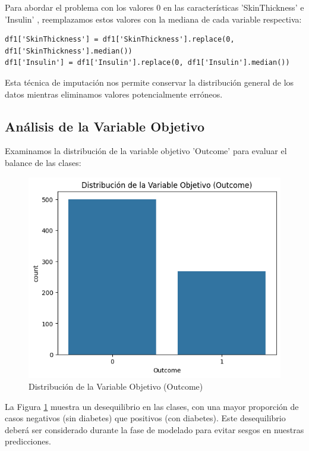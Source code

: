 \documentclass[conference]{IEEEtran}
\begin{document}
Para abordar el problema con los valores 0 en las características 'SkinThickness' e 'Insulin' , reemplazamos estos valores con la mediana de cada variable respectiva:

\begin{lstlisting}
df1['SkinThickness'] = df1['SkinThickness'].replace(0, df1['SkinThickness'].median())
df1['Insulin'] = df1['Insulin'].replace(0, df1['Insulin'].median())
\end{lstlisting}

Esta técnica de imputación nos permite conservar la distribución general de los datos mientras eliminamos valores potencialmente erróneos.

\subsection{Análisis de la Variable Objetivo}

Examinamos la distribución de la variable objetivo 'Outcome' para evaluar el balance de las clases:

\begin{figure}[h]
\centering
\includegraphics[width=\linewidth]{distribucion_outcome.png}
\caption{Distribución de la Variable Objetivo (Outcome)}
\label{fig:outcome_dist}
\end{figure}

La Figura \ref{fig:outcome_dist} muestra un desequilibrio en las clases, con una mayor proporción de casos negativos (sin diabetes) que positivos (con diabetes). Este desequilibrio deberá ser considerado durante la fase de modelado para evitar sesgos en nuestras predicciones.
\end{document}
